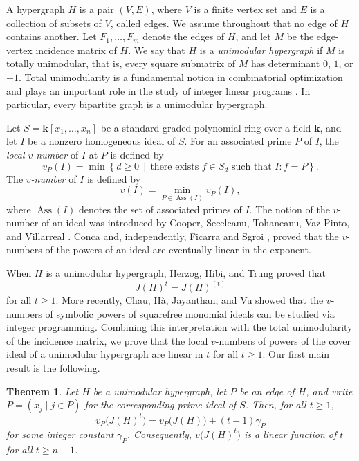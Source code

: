 \documentclass[12pt,amscd]{amsart}
\newtheorem{thm}{Theorem}[section]
\theoremstyle{definition}
\numberwithin{equation}{section}
\DeclareMathOperator{\Ass}{Ass}
\begin{document}
A hypergraph $H$ is a pair $(V,E)$, where $V$ is a finite vertex set and $E$ is a collection of subsets of $V$, called edges. We assume throughout that no edge of $H$ contains another. Let $F_1,\ldots,F_m$ denote the edges of $H$, and let $M$ be the edge-vertex incidence matrix of $H$. We say that $H$ is a \emph{unimodular hypergraph} if $M$ is totally unimodular, that is, every square submatrix of $M$ has determinant $0$, $1$, or $-1$. Total unimodularity is a fundamental notion in combinatorial optimization and plays an important role in the study of integer linear programs \cite{S}. In particular, every bipartite graph is a unimodular hypergraph.

Let $S=\mathbf{k}[x_1,\ldots,x_n]$ be a standard graded polynomial ring over a field $\mathbf{k}$, and let $I$ be a nonzero homogeneous ideal of $S$. For an associated prime $P$ of $I$, the \emph{local $v$-number} of $I$ at $P$ is defined by
\[
v_P(I)
=
\min\left\{
d\ge0 \,\middle|\,
\text{there exists } f\in S_d \text{ such that } I:f=P
\right\}.
\]
The \emph{$v$-number} of $I$ is defined by
\[
v(I)=\min_{P\in\Ass(I)}v_P(I),
\]
where $\Ass(I)$ denotes the set of associated primes of $I$. The notion of the $v$-number of an ideal was introduced by Cooper, Seceleanu, Tohaneanu, Vaz Pinto, and Villarreal \cite{CSTVV}. Conca \cite{C} and, independently, Ficarra and Sgroi \cite{FS}, proved that the $v$-numbers of the powers of an ideal are eventually linear in the exponent.

When $H$ is a unimodular hypergraph, Herzog, Hibi, and Trung \cite{HHT} proved that
\[
J(H)^t=J(H)^{(t)}
\]
for all $t\ge1$. More recently, Chau, H\`a, Jayanthan, and Vu \cite{CHJV} showed that the $v$-numbers of symbolic powers of squarefree monomial ideals can be studied via integer programming. Combining this interpretation with the total unimodularity of the incidence matrix, we prove that the local $v$-numbers of powers of the cover ideal of a unimodular hypergraph are linear in $t$ for all $t\ge1$. Our first main result is the following.

\begin{thm}\label{thm_unimodular}
Let $H$ be a unimodular hypergraph, let $P$ be an edge of $H$, and write
\(
P=(x_j\mid j\in P)
\)
for the corresponding prime ideal of $S$. Then, for all $t\ge1$,
\[
v_P\bigl(J(H)^t\bigr)
=
v_P\bigl(J(H)\bigr)+(t-1)\gamma_P
\]
for some integer constant $\gamma_P$. Consequently,
\(
v\bigl(J(H)^t\bigr)
\)
is a linear function of $t$ for all $t\ge n-1$.
\end{thm}
\end{document}
